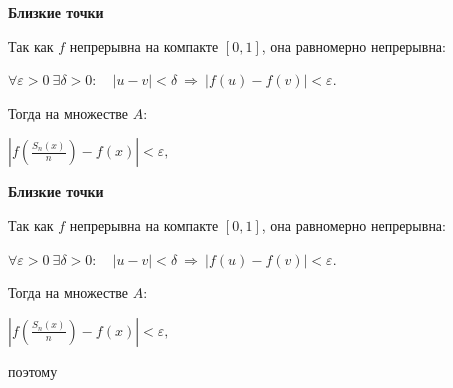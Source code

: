 \documentclass[11pt]{article}
\begin{document}
\begin{center}
{\color{notaeYELLOW}\bfseries\fontsize{44}{52}\selectfont Близкие точки}
\end{center}
\vspace*{\fill}
\begin{center}
\fontsize{36}{43}\selectfont
Так как $f$ непрерывна на компакте $[0,1]$, она равномерно непрерывна:\par\vspace{0.4in}
$\forall \varepsilon>0\ \exists \delta>0: \quad |u-v|<\delta\ \Rightarrow\ |f(u)-f(v)|<\varepsilon.$\par\vspace{0.4in}
Тогда на множестве $A$:\par\vspace{0.4in}
$\left| f\!\left(\frac{S_n(x)}{n}\right) - f(x) \right| < \varepsilon,$\par\vspace{0.4in}
\end{center}
\vspace*{\fill}

\newpage

\begin{center}
{\color{notaeYELLOW}\bfseries\fontsize{44}{52}\selectfont Близкие точки}
\end{center}
\vspace*{\fill}
\begin{center}
\fontsize{36}{43}\selectfont
Так как $f$ непрерывна на компакте $[0,1]$, она равномерно непрерывна:\par\vspace{0.4in}
$\forall \varepsilon>0\ \exists \delta>0: \quad |u-v|<\delta\ \Rightarrow\ |f(u)-f(v)|<\varepsilon.$\par\vspace{0.4in}
Тогда на множестве $A$:\par\vspace{0.4in}
$\left| f\!\left(\frac{S_n(x)}{n}\right) - f(x) \right| < \varepsilon,$\par\vspace{0.4in}
поэтому\par\vspace{0.4in}
\end{center}
\vspace*{\fill}

\newpage
\end{document}
